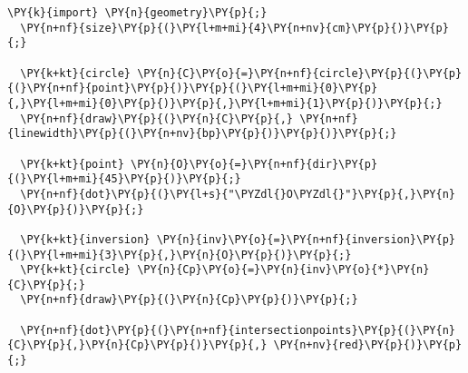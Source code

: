 \begin{Verbatim}[commandchars=\\\{\}]
  \PY{k}{import} \PY{n}{geometry}\PY{p}{;}
  \PY{n+nf}{size}\PY{p}{(}\PY{l+m+mi}{4}\PY{n+nv}{cm}\PY{p}{)}\PY{p}{;}

  \PY{k+kt}{circle} \PY{n}{C}\PY{o}{=}\PY{n+nf}{circle}\PY{p}{(}\PY{p}{(}\PY{n+nf}{point}\PY{p}{)}\PY{p}{(}\PY{l+m+mi}{0}\PY{p}{,}\PY{l+m+mi}{0}\PY{p}{)}\PY{p}{,}\PY{l+m+mi}{1}\PY{p}{)}\PY{p}{;}
  \PY{n+nf}{draw}\PY{p}{(}\PY{n}{C}\PY{p}{,} \PY{n+nf}{linewidth}\PY{p}{(}\PY{n+nv}{bp}\PY{p}{)}\PY{p}{)}\PY{p}{;}

  \PY{k+kt}{point} \PY{n}{O}\PY{o}{=}\PY{n+nf}{dir}\PY{p}{(}\PY{l+m+mi}{45}\PY{p}{)}\PY{p}{;}
  \PY{n+nf}{dot}\PY{p}{(}\PY{l+s}{"\PYZdl{}O\PYZdl{}"}\PY{p}{,}\PY{n}{O}\PY{p}{)}\PY{p}{;}

  \PY{k+kt}{inversion} \PY{n}{inv}\PY{o}{=}\PY{n+nf}{inversion}\PY{p}{(}\PY{l+m+mi}{3}\PY{p}{,}\PY{n}{O}\PY{p}{)}\PY{p}{;}
  \PY{k+kt}{circle} \PY{n}{Cp}\PY{o}{=}\PY{n}{inv}\PY{o}{*}\PY{n}{C}\PY{p}{;}
  \PY{n+nf}{draw}\PY{p}{(}\PY{n}{Cp}\PY{p}{)}\PY{p}{;}

  \PY{n+nf}{dot}\PY{p}{(}\PY{n+nf}{intersectionpoints}\PY{p}{(}\PY{n}{C}\PY{p}{,}\PY{n}{Cp}\PY{p}{)}\PY{p}{,} \PY{n+nv}{red}\PY{p}{)}\PY{p}{;}
\end{Verbatim}
